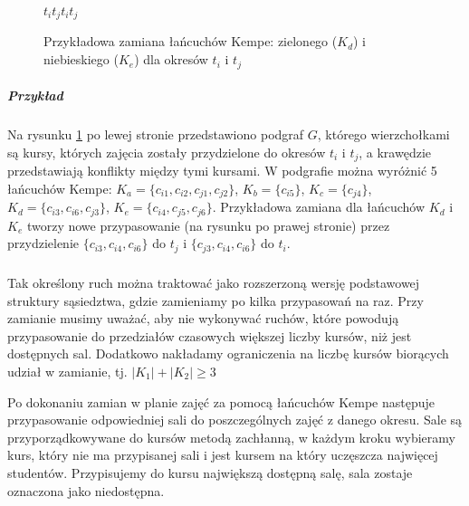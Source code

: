 \begin{enumerate}
\begin{figure}[H]
$t_i$\hspace{4.5cm}$t_j$\hspace{3.25cm}$t_i$\hspace{4.5cm}$t_j$ \\

\caption{Przykładowa zamiana łańcuchów Kempe: zielonego ($K_d$) i niebieskiego ($K_e$) dla okresów $t_i$ i $t_j$}
\label{fig:kempe_swap}
\end{figure}

\subparagraph{Przykład} 
Na rysunku \ref{fig:kempe_swap} po lewej stronie przedstawiono podgraf $G$, którego wierzchołkami są kursy, których zajęcia zostały przydzielone do okresów $t_i$ i $t_j$, a krawędzie przedstawiają konflikty między tymi kursami. W podgrafie można wyróżnić 5 łańcuchów Kempe: $K_a = \{c_{i1}, c_{i2}, c_{j1}, c_{j2}\}$, $K_b = \{c_{i5}\}$, $K_c = \{c_{j4}\}$, $K_d = \{c_{i3}, c_{i6}, c_{j3}\}$, $K_e = \{c_{i4}, c_{j5}, c_{j6}\}$. Przykładowa zamiana dla łańcuchów $K_d$ i $K_e$ tworzy nowe przypasowanie (na rysunku po prawej stronie) przez przydzielenie $\{c_{i3}, c_{i4}, c_{i6}\}$ do $t_j$ i $\{c_{j3}, c_{i4}, c_{i6}\}$ do $t_i$.

\subparagraph{}Tak określony ruch można traktować jako rozszerzoną wersję podstawowej struktury sąsiedztwa, gdzie zamieniamy po kilka przypasowań na raz. Przy zamianie musimy uważać, aby nie wykonywać ruchów, które powodują przypasowanie do przedziałów czasowych większej liczby kursów, niż jest dostępnych sal. Dodatkowo nakładamy ograniczenia na liczbę kursów biorących udział w zamianie, tj. $|K_1|+ |K_2| \geq 3 $

\par Po dokonaniu zamian w planie zajęć za pomocą łańcuchów Kempe następuje przypasowanie odpowiedniej sali do poszczególnych zajęć z danego okresu. Sale są przyporządkowywane do kursów metodą zachłanną, w każdym kroku wybieramy kurs, który nie ma przypisanej sali i jest kursem na który uczęszcza najwięcej studentów. Przypisujemy do kursu największą dostępną salę, sala zostaje oznaczona jako niedostępna.

\end{enumerate}
